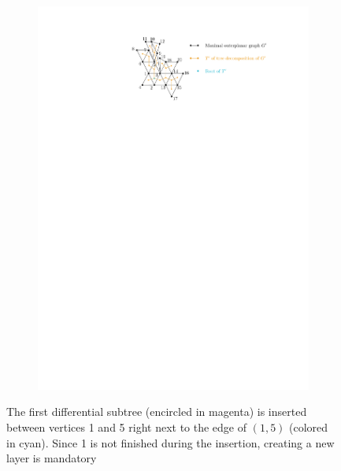 \begin{figure}[H]
\end{figure}


\begin{figure}[H]
	\centering
	\begin{subfigure}{\textwidth}
		\centering
		\includegraphics[page=12,width=0.8\linewidth]{graphics/maximal_outerplanar_example_drawings.pdf}
	\end{subfigure}
	\caption{The first differential subtree (encircled in magenta) is inserted between vertices 1 and 5 right next to the edge of $(1,5)$ (colored in cyan). Since 1 is not finished during the insertion, creating a new layer is mandatory}
\end{figure}


